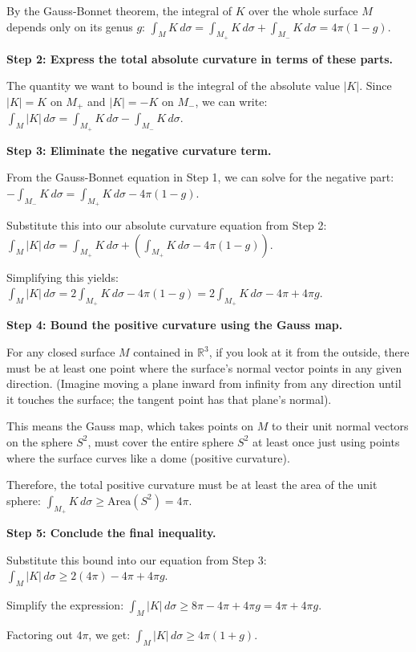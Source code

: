 \begin{solution}
By the Gauss-Bonnet theorem, the integral of $K$ over the whole surface $M$ depends only on its genus $g$:
$\int_M K \, d\sigma = \int_{M_+} K \, d\sigma + \int_{M_-} K \, d\sigma = 4\pi(1 - g)$.

\textbf{Step 2: Express the total absolute curvature in terms of these parts.}

The quantity we want to bound is the integral of the absolute value $|K|$. 
Since $|K| = K$ on $M_+$ and $|K| = -K$ on $M_-$, we can write:
$\int_M |K| \, d\sigma = \int_{M_+} K \, d\sigma - \int_{M_-} K \, d\sigma$.

\textbf{Step 3: Eliminate the negative curvature term.}

From the Gauss-Bonnet equation in Step 1, we can solve for the negative part:
$-\int_{M_-} K \, d\sigma = \int_{M_+} K \, d\sigma - 4\pi(1 - g)$.

Substitute this into our absolute curvature equation from Step 2:
$\int_M |K| \, d\sigma = \int_{M_+} K \, d\sigma + \left( \int_{M_+} K \, d\sigma - 4\pi(1 - g) \right)$.

Simplifying this yields:
$\int_M |K| \, d\sigma = 2 \int_{M_+} K \, d\sigma - 4\pi(1 - g) = 2 \int_{M_+} K \, d\sigma - 4\pi + 4\pi g$.

\textbf{Step 4: Bound the positive curvature using the Gauss map.}

For any closed surface $M$ contained in $\mathbb{R}^3$, if you look at it from the outside, there must be at least one point where the surface's normal vector points in any given direction. (Imagine moving a plane inward from infinity from any direction until it touches the surface; the tangent point has that plane's normal).

This means the Gauss map, which takes points on $M$ to their unit normal vectors on the sphere $S^2$, must cover the entire sphere $S^2$ at least once just using points where the surface curves like a dome (positive curvature). 

Therefore, the total positive curvature must be at least the area of the unit sphere:
$\int_{M_+} K \, d\sigma \geq \text{Area}(S^2) = 4\pi$.

\textbf{Step 5: Conclude the final inequality.}

Substitute this bound into our equation from Step 3:
$\int_M |K| \, d\sigma \geq 2(4\pi) - 4\pi + 4\pi g$.

Simplify the expression:
$\int_M |K| \, d\sigma \geq 8\pi - 4\pi + 4\pi g = 4\pi + 4\pi g$.

Factoring out $4\pi$, we get:
$\int_M |K| \, d\sigma \geq 4\pi(1 + g)$.
\end{solution}

